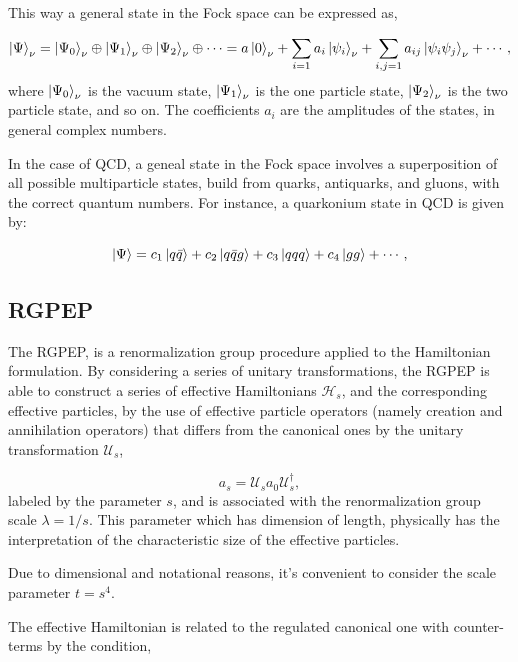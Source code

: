 \documentclass[11pt,a4paper,twoside,pdf]{article}
\numberwithin{equation}{section}
\begin{document}
This way a general state in the Fock space can be expressed as,

\begin{equation}
    \ket{\Psi}_\nu = \ket{\Psi_0}_\nu \oplus \ket{\Psi_1}_\nu \oplus
    \ket{\Psi_2}_\nu \oplus \cdots = a \ket{0}_\nu + \sum_{i=1}a_i \ket{\psi_i}_\nu +
    \sum_{i,j=1}a_{ij} \ket{\psi_i \psi_j}_\nu + \cdots,
\end{equation}
where $\ket{\Psi_0}_\nu$ is the vacuum state, $\ket{\Psi_1}_\nu$ is the one particle
state, $\ket{\Psi_2}_\nu$ is the two particle state, and so on. The coefficients $a_i$
are the amplitudes of the states, in general complex numbers. 

In the case of QCD, a geneal state in the Fock space involves a superposition of all 
possible multiparticle states, build from quarks, antiquarks, and gluons, with the
correct quantum numbers. For instance, a quarkonium state in QCD is given by:

\begin{equation}
    \ket{\Psi} = c_1 \ket{q\bar{q}} + c_2 \ket{q\bar{q}g} + c_3 \ket{qqq} 
    + c_4 \ket{gg} + \cdots,
\end{equation}



\subsection{RGPEP}
The RGPEP, is a renormalization group procedure applied to the Hamiltonian 
formulation. By considering a series of unitary transformations, the RGPEP is able to construct a 
series of effective Hamiltonians $\mathcal{H}_s$, and the corresponding effective 
particles, by the use of effective particle operators (namely creation and 
annihilation operators) that differs from the canonical ones by the unitary 
transformation $\mathcal{U}_s$,

\begin{equation}
    a_s = \mathcal{U}_sa_0\mathcal{U}_s^\dagger,
    \label{eq:effective_particle_operator}
\end{equation}
labeled by the parameter $s$, and is associated with the renormalization group scale
$\lambda = 1/s$. This parameter which has dimension of length, physically has the 
interpretation of the characteristic size of the effective particles.

Due to dimensional and notational reasons, it's convenient to consider the scale 
parameter $t = s^4$.

The effective Hamiltonian is related to the regulated canonical one with counter-terms 
by the condition,
\end{document}
